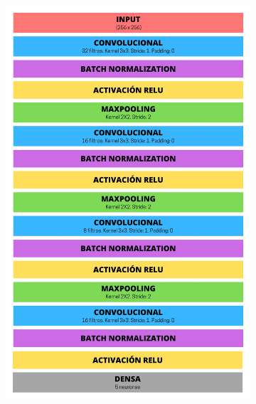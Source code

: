 \begin{figure}[!t]
\vspace{0.3cm} %

\begin{subfigure}[t]{0.35\textwidth}
  \includegraphics[width=\textwidth]{img/estructura_alqudah.png}
\end{subfigure}
\begin{subfigure}[t]{0.25\textwidth}

\end{subfigure}
\end{figure}
